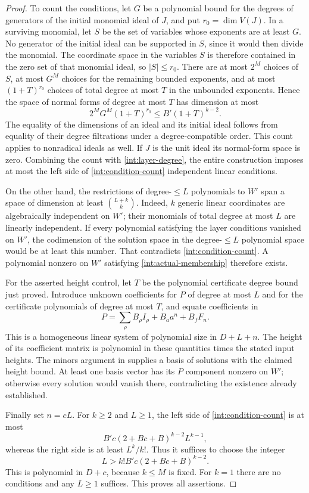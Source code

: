 \begin{proof}
To count the conditions, let $G$ be a polynomial bound for the degrees
of generators of the initial monomial ideal of $J$, and put
$r_0=\dim V(J)$.  In a surviving monomial, let $S$ be the set of
variables whose exponents are at least $G$.  No generator of the
initial ideal can be supported in $S$, since it would then divide the
monomial.  The coordinate space in the variables $S$ is therefore
contained in the zero set of that monomial ideal, so $|S|\leq r_0$.
There are at most $2^M$ choices of $S$, at most $G^M$ choices for
the remaining bounded exponents, and at most $(1+T)^{r_0}$ choices
of total degree at most $T$ in the unbounded exponents.  Hence the
space of normal forms of degree at most $T$ has dimension at most
\[
 2^MG^M(1+T)^{r_0}
   \leq B'(1+T)^{k-2}.
\]
The equality of the dimensions of an ideal and its initial ideal
follows from equality of their degree filtrations under a
degree-compatible order.  This count applies to nonradical ideals
as well.  If $J$ is the unit ideal its normal-form space is zero.
Combining the count with \eqref{int:layer-degree}, the entire
construction imposes at most the left side of
\eqref{int:condition-count} independent linear conditions.

On the other hand, the restrictions of degree-$\leq L$ polynomials
to $W'$ span a space of dimension at least $\binom{L+k}{k}$.
Indeed, $k$ generic linear coordinates are algebraically independent
on $W'$; their monomials of total degree at most $L$ are linearly
independent.  If every polynomial satisfying the layer conditions
vanished on $W'$, the codimension of the solution space in the
degree-$\leq L$ polynomial space would be at least this number.
That contradicts \eqref{int:condition-count}.  A polynomial nonzero
on $W'$ satisfying \eqref{int:actual-membership} therefore exists.

For the asserted height control, let $T$ be the polynomial certificate
degree bound just proved.  Introduce unknown coefficients for $P$
of degree at most $L$ and for the certificate polynomials of degree
at most $T$, and equate coefficients in
\[
 P=\sum_\rho B_\rho I_\rho+B_a a^n+B_f F_n.
\]
This is a homogeneous linear system of polynomial size in $D+L+n$.
The height of its coefficient matrix is polynomial in these quantities
times the stated input heights.  The minors argument in
 supplies a basis of solutions with the claimed
height bound.  At least one basis vector has its $P$ component nonzero
on $W'$; otherwise every solution would vanish there, contradicting
the existence already established.

Finally set $n=cL$.  For $k\geq2$ and $L\geq1$, the left side of
\eqref{int:condition-count} is at most
\[
 B'c(2+Bc+B)^{k-2}L^{k-1},
\]
whereas the right side is at least $L^k/k!$.  Thus it suffices to
choose the integer
\[
 L>k!B'c(2+Bc+B)^{k-2}.
\]
This is polynomial in $D+c$, because $k\leq M$ is fixed.  For $k=1$
there are no conditions and any $L\geq1$ suffices.  This proves all
assertions.
\end{proof}

